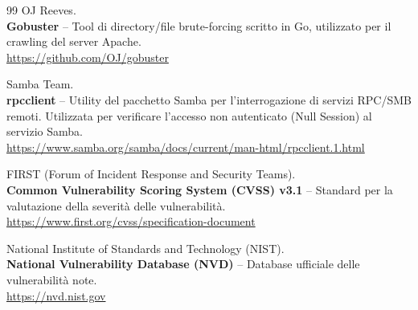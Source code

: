 \documentclass[12pt, a4paper]{article}
\begin{document}
\begin{thebibliography}{99}
	OJ Reeves.\\
	\textbf{Gobuster} -- Tool di directory/file brute-forcing scritto in Go, utilizzato per il crawling del server Apache.\\
	\url{https://github.com/OJ/gobuster}

	Samba Team.\\
	\textbf{rpcclient} -- Utility del pacchetto Samba per l'interrogazione di servizi RPC/SMB remoti.
	Utilizzata per verificare l'accesso non autenticato (Null Session) al servizio Samba.\\
	\url{https://www.samba.org/samba/docs/current/man-html/rpcclient.1.html}

	FIRST (Forum of Incident Response and Security Teams).\\
	\textbf{Common Vulnerability Scoring System (CVSS) v3.1} -- Standard per la valutazione della severità delle vulnerabilità.\\
	\url{https://www.first.org/cvss/specification-document}

	National Institute of Standards and Technology (NIST).\\
	\textbf{National Vulnerability Database (NVD)} -- Database ufficiale delle vulnerabilità note.\\
	\url{https://nvd.nist.gov}
	\end{thebibliography}
\end{document}
